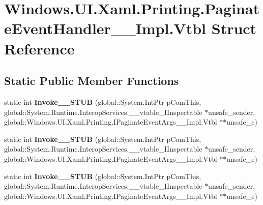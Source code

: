 \hypertarget{struct_windows_1_1_u_i_1_1_xaml_1_1_printing_1_1_paginate_event_handler_____impl_1_1_vtbl}{}\section{Windows.\+U\+I.\+Xaml.\+Printing.\+Paginate\+Event\+Handler\+\_\+\+\_\+\+Impl.\+Vtbl Struct Reference}
\label{struct_windows_1_1_u_i_1_1_xaml_1_1_printing_1_1_paginate_event_handler_____impl_1_1_vtbl}
\subsection*{Static Public Member Functions}
\begin{DoxyCompactItemize}
\item 
\mbox{\label{struct_windows_1_1_u_i_1_1_xaml_1_1_printing_1_1_paginate_event_handler_____impl_1_1_vtbl_ae468fdd69bea805b3137bc6c763405f6}} 
static int {\bfseries Invoke\+\_\+\+\_\+\+S\+T\+UB} (global\+::\+System.\+Int\+Ptr p\+Com\+This, global\+::\+System.\+Runtime.\+Interop\+Services.\+\_\+\+\_\+vtable\+\_\+\+I\+Inspectable $\ast$unsafe\+\_\+sender, global\+::\+Windows.\+U\+I.\+Xaml.\+Printing.\+I\+Paginate\+Event\+Args\+\_\+\+\_\+\+Impl.\+Vtbl $\ast$$\ast$unsafe\+\_\+e)
\item 
\mbox{\label{struct_windows_1_1_u_i_1_1_xaml_1_1_printing_1_1_paginate_event_handler_____impl_1_1_vtbl_ae468fdd69bea805b3137bc6c763405f6}} 
static int {\bfseries Invoke\+\_\+\+\_\+\+S\+T\+UB} (global\+::\+System.\+Int\+Ptr p\+Com\+This, global\+::\+System.\+Runtime.\+Interop\+Services.\+\_\+\+\_\+vtable\+\_\+\+I\+Inspectable $\ast$unsafe\+\_\+sender, global\+::\+Windows.\+U\+I.\+Xaml.\+Printing.\+I\+Paginate\+Event\+Args\+\_\+\+\_\+\+Impl.\+Vtbl $\ast$$\ast$unsafe\+\_\+e)
\item 
\mbox{\label{struct_windows_1_1_u_i_1_1_xaml_1_1_printing_1_1_paginate_event_handler_____impl_1_1_vtbl_ae468fdd69bea805b3137bc6c763405f6}} 
static int {\bfseries Invoke\+\_\+\+\_\+\+S\+T\+UB} (global\+::\+System.\+Int\+Ptr p\+Com\+This, global\+::\+System.\+Runtime.\+Interop\+Services.\+\_\+\+\_\+vtable\+\_\+\+I\+Inspectable $\ast$unsafe\+\_\+sender, global\+::\+Windows.\+U\+I.\+Xaml.\+Printing.\+I\+Paginate\+Event\+Args\+\_\+\+\_\+\+Impl.\+Vtbl $\ast$$\ast$unsafe\+\_\+e)
$$
\end{DoxyCompactItemize}
